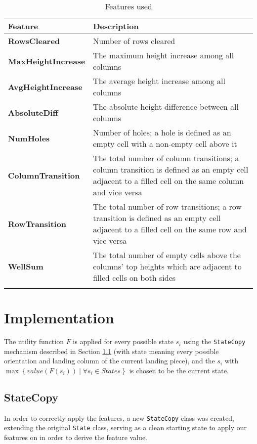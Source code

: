 \documentclass[12pt]{article}
\numberwithin{table}{section}
\begin{document}
\begin{longtable}[H]{|p{4cm}|p{11.2cm}|}
\hline
\textbf{Feature}  & \textbf{Description} \\ \hline
\textbf{RowsCleared }      & Number of rows cleared \\ \hline
\textbf{MaxHeightIncrease} & The maximum height increase among all columns \\ \hline
\textbf{AvgHeightIncrease} & The average height increase among all columns \\ \hline
\textbf{AbsoluteDiff}      & The absolute height difference between all columns \\ \hline
\textbf{NumHoles}          & Number of holes; a hole is defined as an empty cell with a non-empty cell above it \\ \hline
\textbf{ColumnTransition}  & The total number of column transitions; a column transition is defined as an empty cell adjacent to a filled cell on the same column and vice versa \\ \hline
\textbf{RowTransition}     & The total number of row transitions; a row transition is defined as an empty cell adjacent to a filled cell on the same row and vice versa \\ \hline
\textbf{WellSum}           & The total number of empty cells above the columns' top heights which are adjacent to filled cells on both sides \\ \hline
\caption{Features used}
\label{featurestable}
\end{longtable}

\section{Implementation}
The utility function $F$ is applied for every possible state $s_i$ using the \texttt{StateCopy} mechanism described in Section \ref{statecopy} (with state meaning every possible orientation and landing column of the current landing piece), and the $s_i$ with $\max \left\lbrace value(F(s_i)) \mid \forall s_i\in States\right\rbrace$ is chosen to be the current state.
\subsection{StateCopy} \label{statecopy}
In order to correctly apply the features, a new \texttt{StateCopy} class was created, extending the original \texttt{State} class, serving as a clean starting state to apply our features on in order to derive the feature value.
\end{document}
